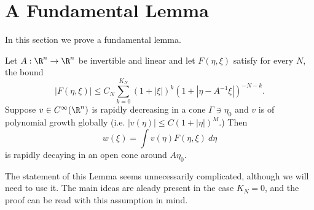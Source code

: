 \documentclass[12pt]{article}
\begin{document}
\section{A Fundamental Lemma}
In this section we prove a fundamental lemma.
\begin{lem}\label{flem}Let $A:\R^n \to \R^n$ be invertible and linear and let $F(\eta,\xi)$ satisfy for every $N$, the bound
\begin{equation}\label{bnd}|F(\eta,\xi)| \leq C_N\sum_{k=0}^{K_N} (1+|\xi|)^{k}(1+|\eta-A^{-1}\xi|)^{-N-k}.\end{equation}
Suppose $v \in C^\infty(\R^n)$ is rapidly decreasing in a cone $\Gamma \ni \eta_0$ and $v$ is of polynomial growth globally (i.e. $|v(\eta)| \leq C(1+|\eta|)^M$.) Then
\[w(\xi) = \int v(\eta)F(\eta,\xi)\ d\eta\]
is rapidly decaying in an open cone around $A\eta_0$.\end{lem}
The statement of this Lemma seems unnecessarily complicated, although we will need to use it. The main ideas are aleady present in the case $K_N = 0$, and the proof can be read with this assumption in mind.
\end{document}

